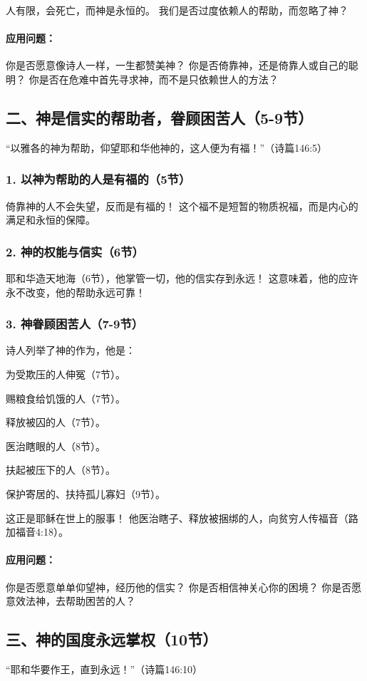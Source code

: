\documentclass[a4paper, 12pt]{article}
\begin{document}
人有限，会死亡，而神是永恒的。
我们是否过度依赖人的帮助，而忽略了神？
\paragraph*{应用问题：}
你是否愿意像诗人一样，一生都赞美神？
你是否倚靠神，还是倚靠人或自己的聪明？
你是否在危难中首先寻求神，而不是只依赖世人的方法？
\subsection*{二、神是信实的帮助者，眷顾困苦人（5-9节）}
“以雅各的神为帮助，仰望耶和华他神的，这人便为有福！”（诗篇146:5）

\subsubsection*{1. 以神为帮助的人是有福的（5节）}
倚靠神的人不会失望，反而是有福的！
这个福不是短暂的物质祝福，而是内心的满足和永恒的保障。
\subsubsection*{2. 神的权能与信实（6节）}
耶和华造天地海（6节），他掌管一切，他的信实存到永远！
这意味着，他的应许永不改变，他的帮助永远可靠！
\subsubsection*{3. 神眷顾困苦人（7-9节）}
诗人列举了神的作为，他是：

为受欺压的人伸冤（7节）。

赐粮食给饥饿的人（7节）。

释放被囚的人（7节）。

医治瞎眼的人（8节）。

扶起被压下的人（8节）。

保护寄居的、扶持孤儿寡妇（9节）。

这正是耶稣在世上的服事！ 他医治瞎子、释放被捆绑的人，向贫穷人传福音（路加福音4:18）。

\paragraph*{应用问题：}
你是否愿意单单仰望神，经历他的信实？
你是否相信神关心你的困境？
你是否愿意效法神，去帮助困苦的人？
\subsection*{三、神的国度永远掌权（10节）}
“耶和华要作王，直到永远！”（诗篇146:10）
\end{document}
